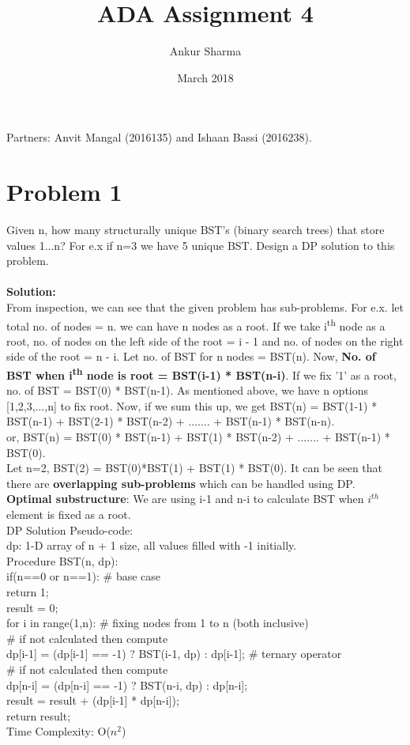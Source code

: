 \documentclass{article}
\title{ADA Assignment 4}
\author{Ankur Sharma }
\date{March 2018}
\newcommand\tab[1][4mm]{\hspace*{#1}}
\begin{document}
\maketitle
\section*{}
Partners: Anvit Mangal (2016135) and Ishaan Bassi (2016238).

\section*{Problem 1}
Given n, how many structurally unique BST's (binary search trees) that store values 1...n? For e.x if n=3 we have 5 unique BST. Design a DP solution to this problem. \\
\vspace{1mm} \\
\textbf{Solution:} \\
From inspection, we can see that the given problem has sub-problems. For e.x. let total no. of nodes = n. we can have n nodes as a root. If we take i\textsuperscript{th} node as a root, no. of nodes on the left side of the root = i - 1 and no. of nodes on the right side of the root = n - i. Let no. of BST for n nodes = BST(n). Now, \textbf{No. of BST when i\textsuperscript{th} node is root = BST(i-1) * BST(n-i)}. If we fix '1' as a root, no. of BST = BST(0) * BST(n-1). As mentioned above, we have n options [1,2,3,...,n] to fix root. Now, if we sum this up, we get BST(n) = BST(1-1) * BST(n-1) + BST(2-1) * BST(n-2) + ....... + BST(n-1) * BST(n-n). \\
or, BST(n) = BST(0) * BST(n-1) + BST(1) * BST(n-2) + ....... + BST(n-1) * BST(0). \\
Let n=2, BST(2) = BST(0)*BST(1) + BST(1) * BST(0). It can be seen that there are \textbf{overlapping sub-problems} which can be handled using DP. \\
\textbf{Optimal substructure}: We are using i-1 and n-i to calculate BST when $i^{th}$ element is fixed as a root. \\
DP Solution Pseudo-code: \\
dp: 1-D array of n + 1 size, all values filled with -1 initially. \\
Procedure BST(n, dp): \\
\tab if(n==0 or n==1): \# base case \\ 
\tab\tab return 1; \\
\tab result = 0; \\ 
\tab for i in range(1,n):  \# fixing nodes from 1 to n (both inclusive)\\
\tab\tab \# if not calculated then compute \\
\tab\tab dp[i-1] = (dp[i-1] == -1) ? BST(i-1, dp) : dp[i-1]; \# ternary operator \\
\tab\tab \# if not calculated then compute \\
\tab\tab dp[n-i] = (dp[n-i] == -1) ? BST(n-i, dp) : dp[n-i]; \\
\tab\tab result = result + (dp[i-1] * dp[n-i]); \\
\tab return result; \\
Time Complexity: O($n^2$)
    
\end{document}
